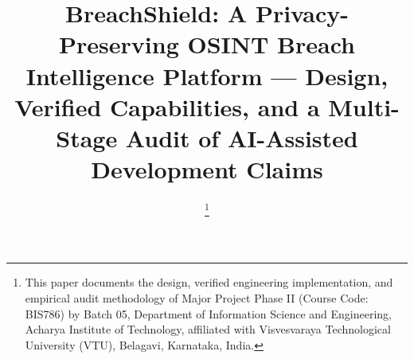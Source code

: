 \documentclass[conference]{IEEEtran}
\begin{document}
\title{BreachShield: A Privacy-Preserving OSINT Breach Intelligence Platform --- Design, Verified Capabilities, and a Multi-Stage Audit of AI-Assisted Development Claims}

\author{
\thanks{This paper documents the design, verified engineering implementation, and empirical audit methodology of Major Project Phase II (Course Code: BIS786) by Batch 05, Department of Information Science and Engineering, Acharya Institute of Technology, affiliated with Visvesvaraya Technological University (VTU), Belagavi, Karnataka, India.}
}

\maketitle
\end{document}
